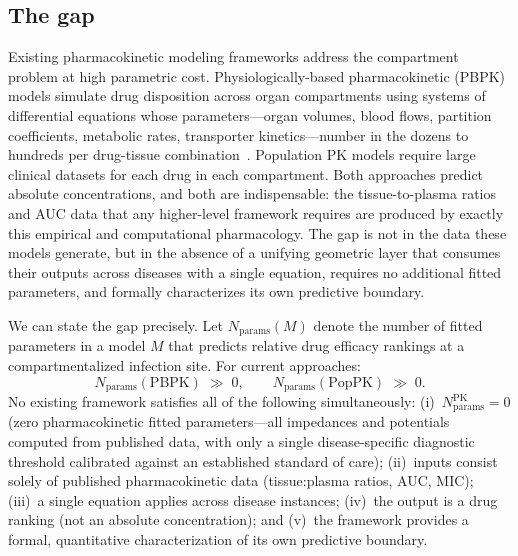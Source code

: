 \documentclass[11pt]{article}
\theoremstyle{plain}
\theoremstyle{definition}
\begin{document}
\subsection{The gap}
\label{sec:gap}

Existing pharmacokinetic modeling frameworks address the compartment
problem at high parametric cost. Physiologically-based pharmacokinetic
(PBPK) models simulate drug disposition across organ compartments
using systems of differential equations whose parameters---organ
volumes, blood flows, partition coefficients, metabolic rates,
transporter kinetics---number in the dozens to hundreds per drug-tissue
combination~\cite{Jones2015, Nestorov2003, Kuepfer2016}. Population
PK models require large clinical datasets for each drug in each
compartment. Both approaches predict absolute concentrations, and
both are indispensable: the tissue-to-plasma ratios and AUC data
that any higher-level framework requires are produced by exactly
this empirical and computational pharmacology. The gap is not in
the data these models generate, but in the absence of a unifying
geometric layer that consumes their outputs across diseases with
a single equation, requires no additional fitted parameters, and
formally characterizes its own predictive boundary.

We can state the gap precisely. Let $N_{\mathrm{params}}(M)$ denote
the number of fitted parameters in a model $M$ that predicts relative
drug efficacy rankings at a compartmentalized infection site. For
current approaches:
%
\begin{equation}
  \label{eq:param-gap}
  N_{\mathrm{params}}(\text{PBPK}) \;\gg\; 0, \qquad
  N_{\mathrm{params}}(\text{PopPK}) \;\gg\; 0.
\end{equation}
%
No existing framework satisfies all of the following simultaneously:
(i)~$N_{\mathrm{params}}^{\mathrm{PK}} = 0$ (zero pharmacokinetic fitted
parameters---all impedances and potentials computed from published data,
with only a single disease-specific diagnostic threshold calibrated
against an established standard of care);
(ii)~inputs consist solely of published pharmacokinetic data
(tissue:plasma ratios, AUC, MIC);
(iii)~a single equation applies across disease instances;
(iv)~the output is a drug ranking (not an absolute concentration);
and (v)~the framework provides a formal, quantitative characterization
of its own predictive boundary.
\end{document}
